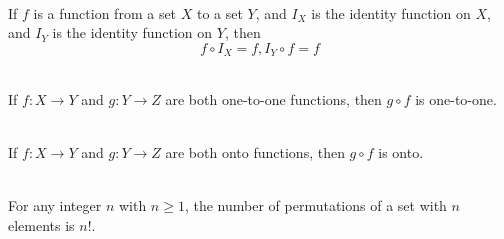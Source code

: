\documentclass[12pt]{article}
\begin{document}
\begin{theorem}[7.3.1]
\hfill\\
\normalfont If $f$ is a function from a set $X$ to a set $Y$, and $I_X$ is the identity function on $X$, and $I_Y$ is the identity function on $Y$, then
\[
f\circ I_X = f, I_Y\circ f=f
\]
\end{theorem}
\begin{theorem}[7.3.3]
\hfill\\
\normalfont If $f:X\to Y$ and $g:Y\to Z$ are both one-to-one functions, then $g\circ f$ is one-to-one.
\end{theorem}
\begin{theorem}[7.3.4]
\hfill\\
\normalfont If $f:X\to Y$ and $g:Y\to Z$ are both onto functions, then $g\circ f$ is onto.
\end{theorem}
\begin{theorem}[9.2.2]
\hfill\\
\normalfont For any integer $n$ with $n\geq 1$, the number of permutations of a set with $n$ elements is $n!$.
\end{theorem}




\clearpage

\clearpage
\end{document}
